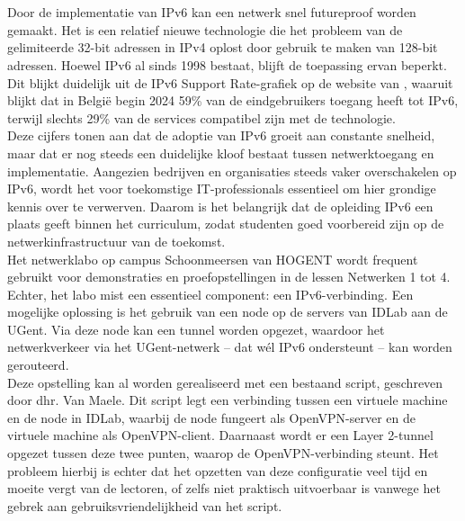 
\chapter{}%
\label{ch:inleiding}

\section{}%
\label{sec:probleemstelling}

Door de implementatie van IPv6 kan een netwerk snel futureproof worden gemaakt. 
Het is een relatief nieuwe technologie die het probleem van de gelimiteerde 32-bit adressen in IPv4 oplost door gebruik te maken van 128-bit adressen. 
Hoewel IPv6 al sinds 1998 bestaat, blijft de toepassing ervan beperkt. Dit blijkt duidelijk uit de IPv6 Support Rate-grafiek op de website van \textcite{EuropeanCommission}, 
waaruit blijkt dat in België begin 2024 59\% van de eindgebruikers toegang heeft tot IPv6, terwijl slechts 29\% van de services compatibel zijn met de technologie.
\\

Deze cijfers tonen aan dat de adoptie van IPv6 groeit aan constante snelheid, maar dat er nog steeds een duidelijke kloof bestaat tussen netwerktoegang en implementatie. 
Aangezien bedrijven en organisaties steeds vaker overschakelen op IPv6, wordt het voor toekomstige IT-professionals essentieel om hier grondige kennis over te verwerven. 
Daarom is het belangrijk dat de opleiding IPv6 een plaats geeft binnen het curriculum, zodat studenten goed voorbereid zijn op de netwerkinfrastructuur van de toekomst.
\\

Het netwerklabo op campus Schoonmeersen van HOGENT wordt frequent gebruikt voor demonstraties en proefopstellingen in de lessen Netwerken 1 tot 4. 
Echter, het labo mist een essentieel component: een IPv6-verbinding. 
Een mogelijke oplossing is het gebruik van een node op de servers van IDLab aan de UGent. 
Via deze node kan een tunnel worden opgezet, waardoor het netwerkverkeer via het UGent-netwerk – dat wél IPv6 ondersteunt – kan worden gerouteerd.
\\

Deze opstelling kan al worden gerealiseerd met een bestaand script, geschreven door dhr. Van Maele. 
Dit script legt een verbinding tussen een virtuele machine en de node in IDLab, waarbij de node fungeert als OpenVPN-server en de virtuele machine als OpenVPN-client. 
Daarnaast wordt er een Layer 2-tunnel opgezet tussen deze twee punten, waarop de OpenVPN-verbinding steunt.
Het probleem hierbij is echter dat het opzetten van deze configuratie veel tijd en moeite vergt van de lectoren, 
of zelfs niet praktisch uitvoerbaar is vanwege het gebrek aan gebruiksvriendelijkheid van het script.

